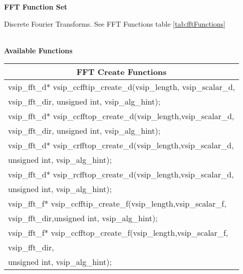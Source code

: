 \clearpage
{\large \textbf{\hypertarget{fftFunc}{FFT Function Set}}}\vspace{.2cm}\\
\hspace*{.3cm}
\parbox{0.85\textwidth}{Discrete Fourier Transforms. See FFT Functions table \ref{tab:fftFunctions}}
\\\cvsiplh 
\newline \hspace*{.8cm} \vspace*{.1cm} \textbf{Available Functions }
\newline \hspace*{0.5cm} {
\ttfamily
\begin{tabular}[H]{|l|}
\multicolumn{1}{c}{\rmfamily \bfseries FFT Create Functions\vspace{.1cm}}\\ \hline
vsip\_fft\_d* vsip\_ccfftip\_create\_d(vsip\_length, vsip\_scalar\_d,\\*\hspace{.7cm}vsip\_fft\_dir, unsigned int, vsip\_alg\_hint);\\
vsip\_fft\_d* vsip\_ccfftop\_create\_d(vsip\_length,vsip\_scalar\_d,\\*\hspace{.7cm}vsip\_fft\_dir, unsigned int, vsip\_alg\_hint);\\
vsip\_fft\_d* vsip\_crfftop\_create\_d(vsip\_length,vsip\_scalar\_d,\\*\hspace{.7cm}unsigned int, vsip\_alg\_hint);\\
vsip\_fft\_d* vsip\_rcfftop\_create\_d(vsip\_length,vsip\_scalar\_d,\\*\hspace{.7cm}unsigned int, vsip\_alg\_hint);\\
vsip\_fft\_f* vsip\_ccfftip\_create\_f(vsip\_length,vsip\_scalar\_f,\\*\hspace{.7cm}vsip\_fft\_dir,unsigned int, vsip\_alg\_hint);\\
vsip\_fft\_f* vsip\_ccfftop\_create\_f(vsip\_length,vsip\_scalar\_f,\\*\hspace{.7cm}vsip\_fft\_dir,\\*\hspace{.7cm}unsigned int, vsip\_alg\_hint);\\

\end{tabular}}
